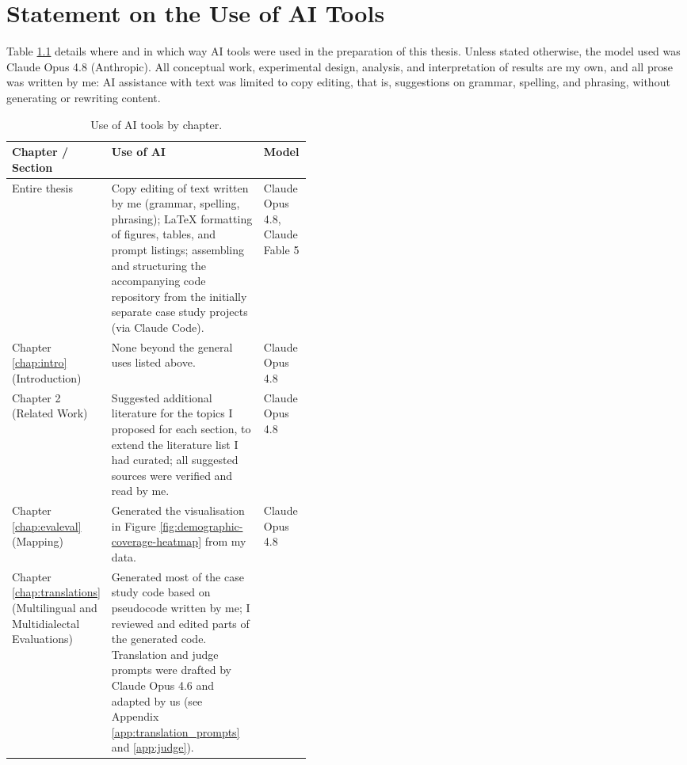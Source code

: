 \chapter{Statement on the Use of AI Tools}
\label{app:ai_use}

Table \ref{tab:ai_use} details where and in which way AI tools were used in the preparation of this thesis. Unless stated otherwise, the model used was Claude Opus 4.8 (Anthropic). All conceptual work, experimental design, analysis, and interpretation of results are my own, and all prose was written by me: AI assistance with text was limited to copy editing, that is, suggestions on grammar, spelling, and phrasing, without generating or rewriting content.

\begin{table}[htb!]
\centering
\small
\caption{Use of AI tools by chapter.}
\label{tab:ai_use}
\begingroup
\renewcommand{\arraystretch}{1.2}
\begin{tabularx}{\linewidth}{@{} >{\raggedright\arraybackslash}p{0.28\linewidth} X >{\raggedright\arraybackslash}p{0.16\linewidth} @{}}
\toprule
\textbf{Chapter / Section} & \textbf{Use of AI} & \textbf{Model} \\
\midrule
Entire thesis &
Copy editing of text written by me (grammar, spelling, phrasing); LaTeX formatting of figures, tables, and prompt listings; assembling and structuring the accompanying code repository from the initially separate case study projects (via Claude Code). &
Claude Opus 4.8, Claude Fable 5 \\
\addlinespace[4pt]
Chapter \ref{chap:intro} (Introduction) &
None beyond the general uses listed above. &
Claude Opus 4.8 \\
\addlinespace[4pt]
Chapter 2 (Related Work) &
Suggested additional literature for the topics I proposed for each section, to extend the literature list I had curated; all suggested sources were verified and read by me. &
Claude Opus 4.8 \\
\addlinespace[4pt]
Chapter \ref{chap:evaleval} (Mapping) &
Generated the visualisation in Figure \ref{fig:demographic-coverage-heatmap} from my data. &
Claude Opus 4.8 \\
\addlinespace[4pt]
Chapter \ref{chap:translations} (Multilingual and Multidialectal Evaluations) &
Generated most of the case study code based on pseudocode written by me; I reviewed and edited parts of the generated code. Translation and judge prompts were drafted by Claude Opus 4.6 and adapted by us (see Appendix \ref{app:translation_prompts} and \ref{app:judge}). &

\end{tabularx}
\end{table}
